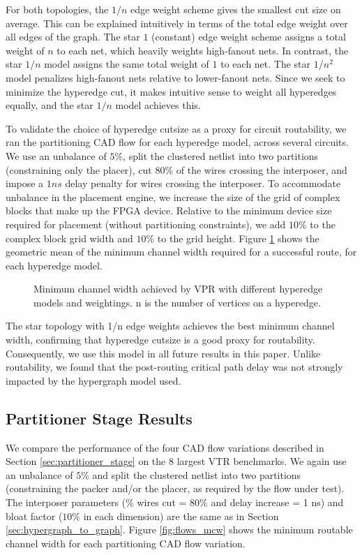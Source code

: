 For both topologies, the $1/n$ edge weight scheme gives the smallest cut size on average. This can be explained intuitively in terms of the total edge weight over all edges of the graph. The star $1$ (constant) edge weight scheme assigns a total weight of $n$ to each net, which heavily weights high-fanout nets. In contrast, the star $1/n$ model assigns the same total weight of $1$ to each net. The star $1/n^2$ model penalizes high-fanout nets relative to lower-fanout nets. Since we seek to minimize the hyperedge cut, it makes intuitive sense to weight all hyperedges equally, and the star $1/n$ model achieves this.

To validate the choice of hyperedge cutsize as a proxy for circuit routability, we ran the partitioning CAD flow for each hyperedge model, across several circuits. We use an unbalance of $5\%$, split the clustered netlist into two partitions (constraining only the placer), cut $80\%$ of the wires crossing the interposer, and impose a $1ns$ delay penalty for wires crossing the interposer. To accommodate unbalance in the placement engine, we increase the size of the grid of complex blocks that make up the FPGA device. Relative to the minimum device size required for placement (without partitioning constraints), we add $10\%$ to the complex block grid width and $10\%$ to the grid height. Figure \ref{fig:graph_topology_mcw} shows the geometric mean of the minimum channel width required for a successful route, for each hyperedge model.

\begin{figure}[!htbp]
\centering

\caption{Minimum channel width achieved by VPR with different hyperedge models and weightings. n is the number of vertices on a hyperedge.}
\label{fig:graph_topology_mcw}
\end{figure}

The star topology with 1/n edge weights achieves the best minimum channel width, confirming that hyperedge cutsize is a good proxy for routability. Consequently, we use this model in all future results in this paper. Unlike routability, we found that the post-routing critical path delay was not strongly impacted by the hypergraph model used.

\subsection{Partitioner Stage Results}\label{sec:partitioner_stage_results}
We compare the performance of the four CAD flow variations described in Section \ref{sec:partitioner_stage} on the 8 largest VTR benchmarks. We again use an unbalance of $5\%$ and split the clustered netlist into two partitions (constraining the packer and/or the placer, as required by the flow under test). The interposer parameters (\% wires cut = $80\%$ and delay increase = 1 ns) and bloat factor ($10\%$ in each dimension) are the same as in Section \ref{sec:hypergraph_to_graph}. Figure \ref{fig:flows_mcw} shows the minimum routable channel width for each partitioning CAD flow variation.

